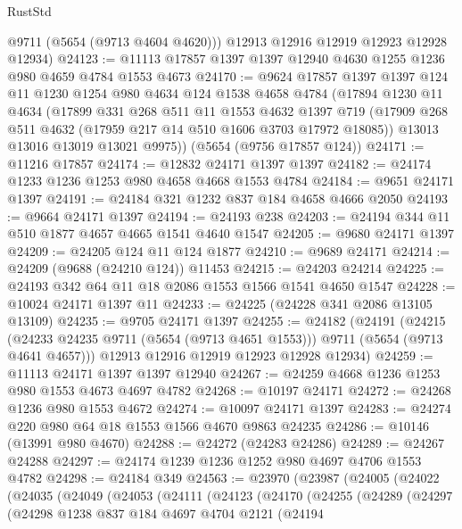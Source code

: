 \begin{lexlean}{RustStd}
\begin{coremodule}
        @9711
        (@5654 (@9713 @4604 @4620)))
      @12913
      @12916
      @12919
      @12923
      @12928
      @12934)
@24123 := @11113 @17857 @1397 @1397 @12940 @4630 @1255 @1236 @980 @4659 @4784 @1553 @4673
@24170 := @9624
    @17857
    @1397
    @1397
    @124
    @11
    @1230
    @1254
    @980
    @4634
    @124
    @1538
    @4658
    @4784
    (@17894
      @1230
      @11
      @4634
      (@17899
        @331
        @268
        @511
        @11
        @1553
        @4632
        @1397
        @719
        (@17909 @268 @511 @4632 (@17959 @217 @14 @510 @1606 @3703 @17972 @18085))
        @13013
        @13016
        @13019
        @13021
        @9975))
    (@5654 (@9756 @17857 @124))
@24171 := @11216 @17857
@24174 := @12832 @24171 @1397 @1397
@24182 := @24174 @1233 @1236 @1253 @980 @4658 @4668 @1553 @4784
@24184 := @9651 @24171 @1397
@24191 := @24184 @321 @1232 @837 @184 @4658 @4666 @2050
@24193 := @9664 @24171 @1397
@24194 := @24193 @238
@24203 := @24194 @344 @11 @510 @1877 @4657 @4665 @1541 @4640 @1547
@24205 := @9680 @24171 @1397
@24209 := @24205 @124 @11 @124 @1877
@24210 := @9689 @24171
@24214 := @24209 (@9688 (@24210 @124)) @11453
@24215 := @24203 @24214
@24225 := @24193 @342 @64 @11 @18 @2086 @1553 @1566 @1541 @4650 @1547
@24228 := @10024 @24171 @1397 @11
@24233 := @24225 (@24228 @341 @2086 @13105 @13109)
@24235 := @9705 @24171 @1397
@24255 := @24182
    (@24191
      (@24215 (@24233 @24235 @9711 (@5654 (@9713 @4651 @1553))) @9711 (@5654 (@9713 @4641 @4657)))
      @12913
      @12916
      @12919
      @12923
      @12928
      @12934)
@24259 := @11113 @24171 @1397 @1397 @12940
@24267 := @24259 @4668 @1236 @1253 @980 @1553 @4673 @4697 @4782
@24268 := @10197 @24171
@24272 := @24268 @1236 @980 @1553 @4672
@24274 := @10097 @24171 @1397
@24283 := @24274 @220 @980 @64 @18 @1553 @1566 @4670 @9863 @24235
@24286 := @10146 (@13991 @980 @4670)
@24288 := @24272 (@24283 @24286)
@24289 := @24267 @24288
@24297 := @24174 @1239 @1236 @1252 @980 @4697 @4706 @1553 @4782
@24298 := @24184 @349
@24563 := @23970
    (@23987
      (@24005
        (@24022
          (@24035
            (@24049
              (@24053
                (@24111
                  (@24123
                    (@24170
                      (@24255
                        (@24289
                          (@24297
                            (@24298
                              @1238
                              @837
                              @184
                              @4697
                              @4704
                              @2121
                              (@24194

\end{coremodule}
\end{lexlean}

